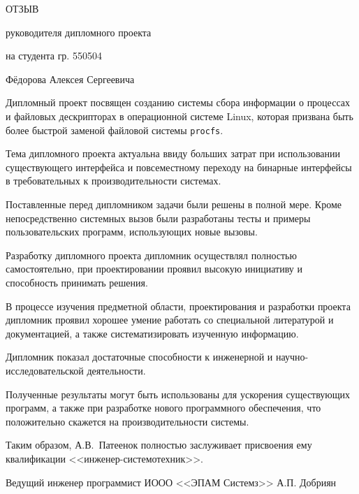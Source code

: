 


\centerline{ОТЗЫВ}
\centerline{руководителя дипломного проекта}
\centerline{на студента гр. 550504}
\centerline{Фёдорова Алексея Сергеевича}
\vspace{\baselineskip}

Дипломный проект посвящен созданию системы сбора информации о процессах и
файловых дескрипторах в операционной системе Linux, которая призвана быть более
быстрой заменой файловой системы \texttt{procfs}.

Тема дипломного проекта актуальна ввиду больших затрат при использовании
существующего интерфейса и повсеместному переходу на бинарные интерфейсы в
требовательных к производительности системах.

Поставленные перед дипломником задачи были решены в полной мере. Кроме
непосредственно системных вызов были разработаны тесты и примеры
пользовательских программ, использующих новые вызовы.

Разработку дипломного проекта дипломник осуществлял полностью самостоятельно, при
проектировании проявил высокую инициативу и способность принимать решения.

В процессе изучения предметной области, проектирования и разработки проекта
дипломник проявил хорошее умение работать со специальной литературой и
документацией, а также систематизировать изученную информацию.

Дипломник показал достаточные способности к инженерной и
научно-исследовательской деятельности.

Полученные результаты могут быть использованы для ускорения существующих
программ, а также при разработке нового программного обеспечения, что
положительно скажется на производительности системы.

Таким образом, А.В.~Патеенок полностью заслуживает присвоения ему квалификации
<<инженер-системотехник>>.

\vspace{\baselineskip}
\noindent
Ведущий инженер программист ИООО <<ЭПАМ Системз>> \hfill А.П. Добриян


